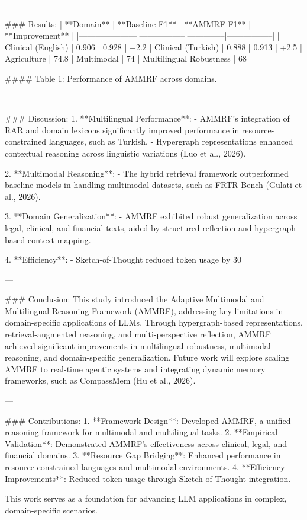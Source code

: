 ---

### Results:
| **Domain**         | **Baseline F1** | **AMMRF F1** | **Improvement** |
|---------------------|-----------------|--------------|-----------------|
| Clinical (English)  | 0.906          | 0.928        | +2.2%
| Clinical (Turkish)  | 0.888          | 0.913        | +2.5%
| Agriculture         | 74.8%
| Multimodal          | 74%
| Multilingual Robustness | 68%

#### Table 1: Performance of AMMRF across domains.

---

### Discussion:
1. **Multilingual Performance**:
   - AMMRF's integration of RAR and domain lexicons significantly improved performance in resource-constrained languages, such as Turkish.
   - Hypergraph representations enhanced contextual reasoning across linguistic variations (Luo et al., 2026).

2. **Multimodal Reasoning**:
   - The hybrid retrieval framework outperformed baseline models in handling multimodal datasets, such as FRTR-Bench (Gulati et al., 2026).

3. **Domain Generalization**:
   - AMMRF exhibited robust generalization across legal, clinical, and financial texts, aided by structured reflection and hypergraph-based context mapping.

4. **Efficiency**:
   - Sketch-of-Thought reduced token usage by 30%

---

### Conclusion:
This study introduced the Adaptive Multimodal and Multilingual Reasoning Framework (AMMRF), addressing key limitations in domain-specific applications of LLMs. Through hypergraph-based representations, retrieval-augmented reasoning, and multi-perspective reflection, AMMRF achieved significant improvements in multilingual robustness, multimodal reasoning, and domain-specific generalization. Future work will explore scaling AMMRF to real-time agentic systems and integrating dynamic memory frameworks, such as CompassMem (Hu et al., 2026).

---

### Contributions:
1. **Framework Design**: Developed AMMRF, a unified reasoning framework for multimodal and multilingual tasks.
2. **Empirical Validation**: Demonstrated AMMRF's effectiveness across clinical, legal, and financial domains.
3. **Resource Gap Bridging**: Enhanced performance in resource-constrained languages and multimodal environments.
4. **Efficiency Improvements**: Reduced token usage through Sketch-of-Thought integration.

This work serves as a foundation for advancing LLM applications in complex, domain-specific scenarios.
